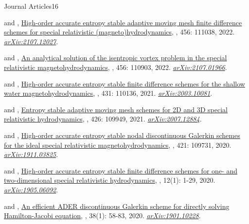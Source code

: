 \begin{cvpublicationsection}{Journal Articles}{16}
%
\item {} and , \href{https://doi.org/10.1016/j.jcp.2022.111038}{High-order accurate entropy stable adaptive moving mesh finite difference schemes for special relativistic (magneto)hydrodynamics}, , 456: 111038, 2022. \href{https://arxiv.org/abs/2107.12027}{\em arXiv:2107.12027}.
%
\item {} and , \href{https://doi.org/10.1016/j.jcp.2021.110903}{An analytical solution of the isentropic vortex problem in the special relativistic magnetohydrodynamics}, , 456: 110903, 2022. \href{https://arxiv.org/abs/2107.01966}{\em arXiv:2107.01966}.
%
\item {} and , \href{https://doi.org/10.1016/j.jcp.2021.110136}{High-order accurate entropy stable finite difference schemes for the shallow water magnetohydrodynamics}, , 431: 110136, 2021. \href{https://arxiv.org/abs/2003.10081}{\em arXiv:2003.10081}.
%
\item {} and , \href{https://doi.org/10.1016/j.jcp.2020.109949}{Entropy stable adaptive moving mesh schemes for 2D and 3D special relativistic hydrodynamics}, , 426: 109949, 2021. \href{https://arxiv.org/abs/2007.12884}{\em arXiv:2007.12884}.
%
\item {} and , \href{https://doi.org/10.1016/j.jcp.2020.109731}{High-order accurate entropy stable nodal discontinuous Galerkin schemes for the ideal special relativistic magnetohydrodynamics}, , 421: 109731, 2020. \href{https://arxiv.org/abs/1911.03825}{\em arXiv:1911.03825}.
%
\item {} and , \href{https://doi.org/10.4208/aamm.OA-2019-0124}{High-order accurate entropy stable finite difference schemes for one- and two-dimensional special relativistic hydrodynamics}, , 12(1): 1-29, 2020. \href{https://arxiv.org/abs/1905.06092}{\em arXiv:1905.06092}.
%
\item {} and , \href{https://doi.org/10.4208/jcm.1902-m2018-0189}{An efficient ADER discontinuous Galerkin scheme for directly solving Hamilton-Jacobi equation}, , 38(1): 58-83, 2020. \href{https://arxiv.org/abs/1901.10228}{\em arXiv:1901.10228}.

\end{cvpublicationsection}
